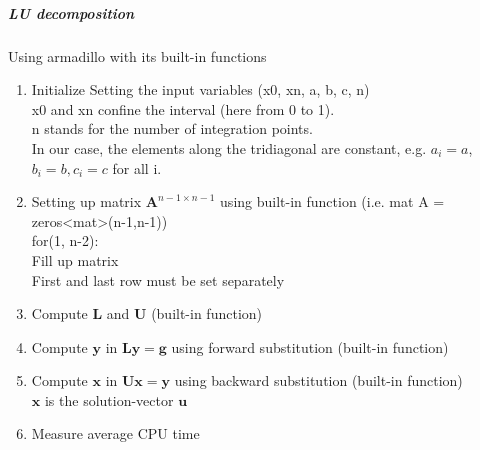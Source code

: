 \documentclass[%
oneside,                 %
final,                   %
10pt]{article}
\begin{document}
\subparagraph{LU decomposition}
Using armadillo with its built-in functions
\begin{enumerate}
\item Initialize Setting the input variables (x0, xn, a, b, c, n) \\
	x0 and xn confine the interval (here from 0 to 1). \\
	n stands for the number of integration points. \\
	In our case, the elements along the tridiagonal are constant, e.g. $a_i=a$, $b_i=b, c_i=c$ for all i. 

\item Setting up matrix $\mathbf{A}^{n-1 \times n-1}$ using built-in function (i.e. mat A = zeros<mat>(n-1,n-1))\\
	 for(1, n-2): \\
	 Fill up matrix \\
	 First and last row must be set separately
		
\item Compute $\mathbf{L}$ and $\mathbf{U}$ (built-in function)

\item Compute $\mathbf{y}$ in $\mathbf{Ly}=\mathbf{g}$ using forward substitution (built-in function)

\item Compute $\mathbf{x}$ in $\mathbf{Ux}=\mathbf{y}$ using backward substitution (built-in function)\\
		$\mathbf{x}$ is the solution-vector $\mathbf{u}$ 

\item Measure average CPU time		
\end{enumerate}
\end{document}
